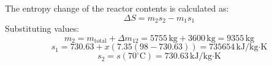 The entropy change of the reactor contents is calculated as:  
\[
\Delta S = m_2 s_2 - m_1 s_1
\]  
Substituting values:  
\[
m_2 = m_{\text{total}} + \Delta m_{12} = 5755 \, \text{kg} + 3600 \, \text{kg} = 9355 \, \text{kg}
\]  
\[
s_1 = 730.63 + x (7.35 (98 - 730.63)) = 735654 \, \text{kJ/kg·K}
\]  
\[
s_2 = s(70^\circ\text{C}) = 730.63 \, \text{kJ/kg·K}
\]